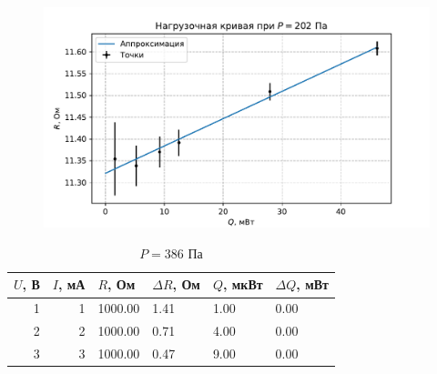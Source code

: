 \begin{figure}[H]\centering\includegraphics[width=\textwidth]{graphs/RQ201.83695244139577.pdf}\end{figure}\begin{table}[H]
\centering
\caption{$P = 386$ Па}
\begin{tabular}{rrllll}
\hline
 $U$, В &  $I$, мА &       $R$, Ом & $\Delta R$, Ом &    $Q$, мкВт & $\Delta Q$, мВт \\ \hline
    1 &      1 & 1000.00 &           1.41 & 1.00 &            0.00 \\ \hline
    2 &      2 & 1000.00 &           0.71 & 4.00 &            0.00 \\ \hline
    3 &      3 & 1000.00 &           0.47 & 9.00 &            0.00 \\ \hline
\end{tabular}
\end{table}
